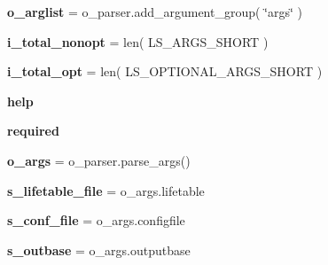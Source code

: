 \begin{DoxyCompactItemize}
\item 
{\bfseries o\+\_\+arglist} = o\+\_\+parser.\+add\+\_\+argument\+\_\+group( \char`\"{}args\char`\"{} )\hypertarget{namespacenegui_1_1pgopsimupop_a5b8f9210f95d7391c479cdfc25ca0071}{}\label{namespacenegui_1_1pgopsimupop_a5b8f9210f95d7391c479cdfc25ca0071}

\item 
{\bfseries i\+\_\+total\+\_\+nonopt} = len( L\+S\+\_\+\+A\+R\+G\+S\+\_\+\+S\+H\+O\+RT )\hypertarget{namespacenegui_1_1pgopsimupop_a4dc340484721dd3b5dfe5f40411a25cc}{}\label{namespacenegui_1_1pgopsimupop_a4dc340484721dd3b5dfe5f40411a25cc}

\item 
{\bfseries i\+\_\+total\+\_\+opt} = len( L\+S\+\_\+\+O\+P\+T\+I\+O\+N\+A\+L\+\_\+\+A\+R\+G\+S\+\_\+\+S\+H\+O\+RT )\hypertarget{namespacenegui_1_1pgopsimupop_a240969d725ee39df4061c3da9e3f78e5}{}\label{namespacenegui_1_1pgopsimupop_a240969d725ee39df4061c3da9e3f78e5}

\item 
{\bfseries help}\hypertarget{namespacenegui_1_1pgopsimupop_a43f661ef7e5c3c7f71286e0766b3fd45}{}\label{namespacenegui_1_1pgopsimupop_a43f661ef7e5c3c7f71286e0766b3fd45}

\item 
{\bfseries required}\hypertarget{namespacenegui_1_1pgopsimupop_aa9fa888a53b9895df84e951768683b0f}{}\label{namespacenegui_1_1pgopsimupop_aa9fa888a53b9895df84e951768683b0f}

\item 
{\bfseries o\+\_\+args} = o\+\_\+parser.\+parse\+\_\+args()\hypertarget{namespacenegui_1_1pgopsimupop_a08acd0798fc644e72dd65ba1addce386}{}\label{namespacenegui_1_1pgopsimupop_a08acd0798fc644e72dd65ba1addce386}

\item 
{\bfseries s\+\_\+lifetable\+\_\+file} = o\+\_\+args.\+lifetable\hypertarget{namespacenegui_1_1pgopsimupop_a35a54163d82dbd1ddbb96e7d1cf1ad92}{}\label{namespacenegui_1_1pgopsimupop_a35a54163d82dbd1ddbb96e7d1cf1ad92}

\item 
{\bfseries s\+\_\+conf\+\_\+file} = o\+\_\+args.\+configfile\hypertarget{namespacenegui_1_1pgopsimupop_a67afb09bc187a54d3173444bab6288e9}{}\label{namespacenegui_1_1pgopsimupop_a67afb09bc187a54d3173444bab6288e9}

\item 
{\bfseries s\+\_\+outbase} = o\+\_\+args.\+outputbase\hypertarget{namespacenegui_1_1pgopsimupop_af359ecec2ed0e032f754420b48f0eea5}{}\label{namespacenegui_1_1pgopsimupop_af359ecec2ed0e032f754420b48f0eea5}


\end{DoxyCompactItemize}
